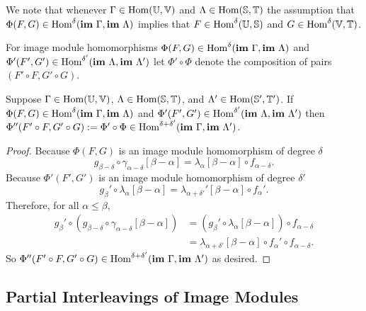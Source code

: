We note that whenever $\Gamma\in\mathrm{Hom}(\mathbb{U},\mathbb{V})$ and $\Lambda\in\mathrm{Hom}(\mathbb{S},\mathbb{T})$ the assumption that $\Phi(F, G)\in\mathrm{Hom}^\delta(\mathbf{im}~\Gamma, \mathbf{im}~\Lambda)$ implies that $F\in\mathrm{Hom}^\delta(\mathbb{U},\mathbb{S})$ and $G\in\mathrm{Hom}^\delta(\mathbb{V},\mathbb{T})$.

For image module homomorphisms $\Phi(F, G)\in\mathrm{Hom}^\delta(\mathbf{im}~\Gamma, \mathbf{im}~\Lambda)$ and $\Phi'(F', G')\in\mathrm{Hom}^{\delta'}(\mathbf{im}~\Lambda, \mathbf{im}~\Lambda')$ let $\Phi'\circ \Phi$ denote the composition of pairs $(F'\circ F, G'\circ G)$.

\begin{lemma}\label{lem:image_composition}
  Suppose $\Gamma\in\mathrm{Hom}(\mathbb{U},\mathbb{V})$, $\Lambda\in\mathrm{Hom}(\mathbb{S},\mathbb{T})$, and $\Lambda'\in\mathrm{Hom}(\mathbb{S}',\mathbb{T}')$.
  If $\Phi(F, G)\in\mathrm{Hom}^\delta(\mathbf{im}~\Gamma, \mathbf{im}~\Lambda)$ and $\Phi'(F', G')\in\mathrm{Hom}^{\delta'}(\mathbf{im}~\Lambda, \mathbf{im}~\Lambda')$ then $\Phi''(F'\circ F, G'\circ G) := \Phi'\circ\Phi\in\mathrm{Hom}^{\delta+\delta'}(\mathbf{im}~\Gamma,\mathbf{im}~\Lambda')$.
\end{lemma}
\begin{proof}
  Because $\Phi(F, G)$ is an image module homomorphism of degree $\delta$
  \[ g_{\beta-\delta}\circ\gamma_{\alpha-\delta}[\beta-\alpha] = \lambda_\alpha[\beta-\alpha]\circ f_{\alpha-\delta}.\]
  Because $\Phi'(F', G')$ is an image module homomorphism of degree $\delta'$
  \[ g_{\beta}'\circ\lambda_{\alpha}[\beta-\alpha] = \lambda_{\alpha +\delta'}'[\beta-\alpha]\circ f_{\alpha}'.\]
  Therefore, for all $\alpha\leq\beta$,
  \begin{align*}
    g_\beta'\circ (g_{\beta-\delta}\circ \gamma_{\alpha-\delta}[\beta-\alpha]) &= (g_\beta'\circ \lambda_\alpha[\beta-\alpha])\circ f_{\alpha-\delta}\\
      &=\lambda_{\alpha+\delta'}[\beta-\alpha]\circ f_\alpha'\circ f_{\alpha-\delta}.
  \end{align*}
  So $\Phi''(F'\circ F, G'\circ G)\in\mathrm{Hom}^{\delta+\delta'}(\mathbf{im}~\Gamma,\mathbf{im}~\Lambda')$ as desired.

\end{proof}

\subsection{Partial Interleavings of Image Modules}

